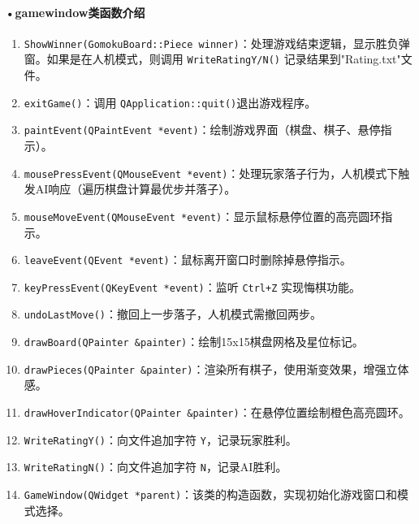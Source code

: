 \documentclass[UTF8]{ctexart}
\begin{document}
\paragraph{•gamewindow类函数介绍}
\begin{enumerate}
    \item \texttt{ShowWinner(GomokuBoard::Piece winner)}：处理游戏结束逻辑，显示胜负弹窗。如果是在人机模式，则调用 \texttt{WriteRatingY/N()} 记录结果到"Rating.txt"文件。
    \item \texttt{exitGame()}：调用 \texttt{QApplication::quit()}退出游戏程序。
    \item \texttt{paintEvent(QPaintEvent *event)}：绘制游戏界面（棋盘、棋子、悬停指示）。
    \item \texttt{mousePressEvent(QMouseEvent *event)}：处理玩家落子行为，人机模式下触发AI响应（遍历棋盘计算最优步并落子）。
    \item \texttt{mouseMoveEvent(QMouseEvent *event)}：显示鼠标悬停位置的高亮圆环指示。
    \item \texttt{leaveEvent(QEvent *event)}：鼠标离开窗口时删除掉悬停指示。
    \item \texttt{keyPressEvent(QKeyEvent *event)}：监听 \texttt{Ctrl+Z} 实现悔棋功能。
    \item \texttt{undoLastMove()}：撤回上一步落子，人机模式需撤回两步。
    \item \texttt{drawBoard(QPainter \&painter)}：绘制15x15棋盘网格及星位标记。
    \item \texttt{drawPieces(QPainter \&painter)}：渲染所有棋子，使用渐变效果，增强立体感。
    \item \texttt{drawHoverIndicator(QPainter \&painter)}：在悬停位置绘制橙色高亮圆环。
    \item \texttt{WriteRatingY()}：向文件追加字符 \texttt{Y}，记录玩家胜利。
    \item \texttt{WriteRatingN()}：向文件追加字符 \texttt{N}，记录AI胜利。
    \item \texttt{GameWindow(QWidget *parent)}：该类的构造函数，实现初始化游戏窗口和模式选择。
\end{enumerate}
\end{document}
